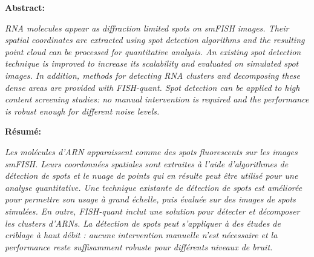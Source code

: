 
\textbf{Abstract:}
\hspace{0.5cm}

\textit{
RNA molecules appear as diffraction limited spots on smFISH images.
Their spatial coordinates are extracted using spot detection algorithms and the resulting point cloud can be processed for quantitative analysis.
An existing spot detection technique is improved to increase its scalability and evaluated on simulated spot images.
In addition, methods for detecting RNA clusters and decomposing these dense areas are provided with FISH-quant.
Spot detection can be applied to high content screening studies: no manual intervention is required and the performance is robust enough for different noise levels.
}

\vspace{0.5cm}

\noindent
\textbf{Résumé:}
\hspace{0.5cm}

\textit{
Les molécules d'ARN apparaissent comme des spots fluorescents sur les images smFISH.
Leurs coordonnées spatiales sont extraites à l'aide d'algorithmes de détection de spots et le nuage de points qui en résulte peut être utilisé pour une analyse quantitative.
Une technique existante de détection de spots est améliorée pour permettre son usage à grand échelle, puis évaluée sur des images de spots simulées.
En outre, FISH-quant inclut une solution pour détecter et décomposer les clusters d'ARNs.
La détection de spots peut s'appliquer à des études de criblage à haut débit : aucune intervention manuelle n'est nécessaire et la performance reste suffisamment robuste pour différents niveaux de bruit.
}